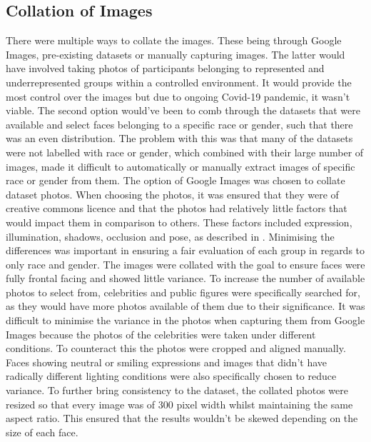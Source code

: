 \documentclass{l4proj}
\begin{document}
\subsection{Collation of Images}
There were multiple ways to collate the images. These being through Google Images, pre-existing datasets or manually capturing images.
The latter would have involved taking photos of participants belonging to represented and underrepresented groups within a controlled environment. It would provide the most control over the images but due to ongoing Covid-19 pandemic, it wasn't viable. The second option would've been to comb through the datasets that were available and select faces belonging to a specific race or gender, such that there was an even distribution. The problem with this was that many of the datasets were not labelled with race or gender, which combined with their large number of images, made it difficult to automatically or manually extract images of specific race or gender from them. The option of Google Images was chosen to collate dataset photos. When choosing the photos, it was ensured that they were of creative commons licence and that the photos had relatively little factors that would impact them in comparison to others. These factors included expression, illumination, shadows, occlusion and pose, as described in \cite{expression}. Minimising the differences was important in ensuring a fair evaluation of each group in regards to only race and gender.  The images were collated with the goal to ensure faces were fully frontal facing and showed little variance. To increase the number of available photos to select from, celebrities and public figures were specifically searched for, as they would have more photos available of them due to their significance. It was difficult to minimise the variance in the photos when capturing them from Google Images because the photos of the celebrities were taken under different conditions. To counteract this the photos were cropped and aligned manually. Faces showing neutral or smiling expressions and images that didn't have radically different lighting conditions were also specifically chosen to reduce variance. To further bring consistency to the dataset, the collated photos were resized so that every image was of 300 pixel width whilst maintaining the same aspect ratio. This ensured that the results wouldn't be skewed depending on the size of each face.
\end{document}
